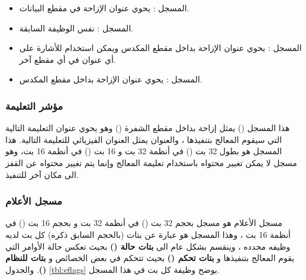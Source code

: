 \documentclass[document.tex]{subfiles}
\begin{document}
\begin{itemize}
\item المسجل : يحوي عنوان الإزاحة في مقطع البيانات.
\item المسجل : نفس الوظيفة السابقة.
\item المسجل : يحوي عنوان الإزاحة بداخل مقطع المكدس ويمكن استخدام للأشارة على أي عنوان في أي مقطع آخر.
\item المسجل : يحوي عنوان الإزاحة بداخل مقطع المكدس.

\end{itemize}


\subsubsection{مؤشر التعليمة }
هذا المسجل () يمثل إزاحة بداخل مقطع الشفرة () وهو يحوي عنوان التعليمة التالية التي سيقوم المعالج بتنفيذها ، والعنوان  يمثل العنوان الفيزيائي للتعليمة التالية. هذا المسجل هو بطول 32 بت () في أنظمة 32 بت و 16 بت () في أنظمة 16 بت، وهو مسجل لا يمكن تغيير محتواه باستخدام تعليمة المعالج  وإنما يتم تغيير محتواه عن القفز الى مكان آخر للتنفيذ.

\subsubsection{مسجل الأعلام }
مسجل الأعلام هو مسجل بحجم 32 بت () في أنظمة 32 بت و بحجم 16 بت () في أنظمة 16 بت ، وهذا المسجل هو عبارة عن بتات (بالحجم السابق ذكره) كل بت لديه وظيفه محدده ، وينقسم بشكل عام الى \textbf{بتات حالة ()} بحيث تعكس حالة الأوامر التي يقوم المعالج بتنفيذها و \textbf{بتات تحكم ()} بحيث تتحكم في بعض الخصائص و \textbf{بتات للنظام ()}. والجدول \ref{tbl:eflags} يوضح وظيفة كل بت في هذا المسجل.
\end{document}
